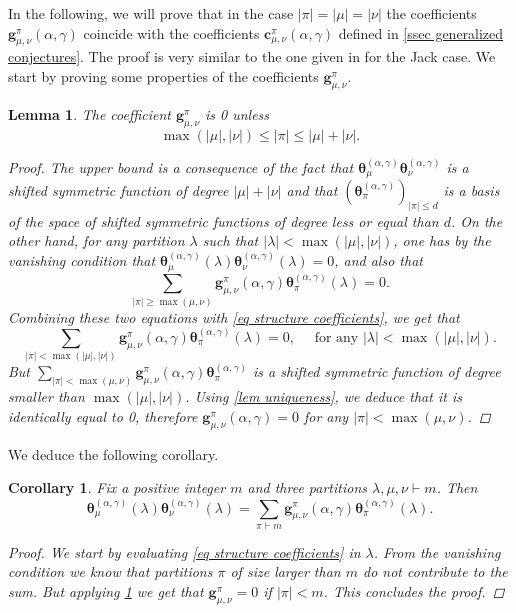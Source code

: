 \documentclass[12pt]{amsart}
\newtheorem{cor}[thm]{Corollary}
\newtheorem{lem}[thm]{Lemma}
\theoremstyle{remark}
\newcommand{\bfc}{\boldsymbol{c}}
\newcommand{\bfg}{\boldsymbol{g}}
\newcommand{\MchJack}{{\boldsymbol{\theta}}^{(\alpha,\gamma)}}
\begin{document}
In the following, we will prove that in the case $|\pi|=|\mu|=|\nu|$ the coefficients $\bfg^\pi_{\mu,\nu}(\alpha,\gamma)$ coincide with the coefficients $\bfc^\pi_{\mu,\nu}(\alpha,\gamma)$  defined in \cref{ssec generalized conjectures}. The proof is very similar to the one given in \cite{DolegaFeray2016} for the Jack case.
We start by proving some properties of the coefficients $\bfg^\pi_{\mu,\nu}$.
\begin{lem}\label{lem bounds}
    The coefficient 
    $\bfg^\pi_{\mu,\nu}$ is 0 unless 
    $$\max(|\mu|,|\nu|)\leq|\pi|\leq |\mu|+|\nu|.$$

    \begin{proof}
      The upper bound is a consequence of the fact that $\MchJack_\mu \MchJack_\nu$ is a shifted symmetric function of degree $|\mu|+|\nu|$ and that $\left(\MchJack_\pi\right)_{|\pi|\leq d}$ is a basis of the space of shifted symmetric functions of degree less or equal than $d$. On the other hand, for any partition $\lambda$ such that $|\lambda|<\max(|\mu|,|\nu|)$, one has by the vanishing condition that 
      $\MchJack_\mu(\lambda)\MchJack_\nu(\lambda)=0$, and also that
      $$\sum_{|\pi|\geq \max(\mu,\nu)}\bfg^\pi_{\mu,\nu}(\alpha,\gamma)\MchJack_\pi(\lambda)=0.$$ Combining these two equations with \cref{eq structure coefficients}, we get that 
      $$\sum_{|\pi|<\max(|\mu|,|\nu|)}\bfg^\pi_{\mu,\nu}(\alpha,\gamma)\MchJack_\pi(\lambda)=0,\quad \text{ for any }|\lambda|<\max(|\mu|,|\nu|).$$
      But $\sum_{|\pi|< \max(\mu,\nu)}\bfg^\pi_{\mu,\nu}(\alpha,\gamma)\MchJack_\pi$ is a shifted symmetric function of degree smaller than $\max(|\mu|,|\nu|)$. Using \cref{lem uniqueness}, we deduce that it is identically equal to 0, therefore  $\bfg^\pi_{\mu,\nu}(\alpha,\gamma)=0$ for any $|\pi|<\max(\mu,\nu)$.
    \end{proof}
\end{lem}

We deduce the following corollary.

\begin{cor}\label{cor g}
    Fix a positive integer $m$ and three partitions $\lambda,\mu,\nu\vdash m$. Then 
    $$\MchJack_\mu(\lambda) \MchJack_\nu(\lambda)=\sum_{\pi\vdash m}\bfg^\pi_{\mu,\nu}(\alpha,\gamma)\MchJack_\pi(\lambda).$$ 

    \begin{proof}
        We start by evaluating \cref{eq structure coefficients} in $\lambda$. From the vanishing condition we know that partitions $\pi$ of size larger than $m$ do not contribute to the sum. But  applying \cref{lem bounds} we get that $\bfg^\pi_{\mu,\nu}=0$ if $|\pi|<m$. This concludes the proof. 
    \end{proof}
\end{cor}
\end{document}
